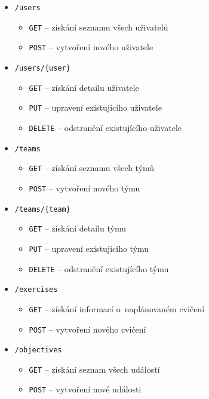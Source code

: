 \documentclass[
  digital,
  twoside,
  table, 
  nolof, 
  nolot
]{fithesis3}
\begin{document}
\renewcommand\labelitemii{$\square$}
\begin{itemize}
    \item \texttt{/users}
    \begin{itemize}
        \item \texttt{GET} -- získání seznamu všech uživatelů
        \item \texttt{POST} --  vytvoření nového uživatele
    \end{itemize}
    
    \item \texttt{/users/\{user\}}
    \begin{itemize}
        \item \texttt{GET} -- získání detailu uživatele
        \item \texttt{PUT} -- upravení existujícího uživatele
        \item \texttt{DELETE} -- odstranění existujícího uživatele
    \end{itemize}
    
    \item \texttt{/teams}
    \begin{itemize}
        \item \texttt{GET} -- získání seznamu všech týmů
        \item \texttt{POST} --  vytvoření nového týmu
    \end{itemize}
    
    \item \texttt{/teams/\{team\}}
    \begin{itemize}
        \item \texttt{GET} -- získání detailu týmu
        \item \texttt{PUT} -- upravení existujícího týmu
        \item \texttt{DELETE} -- odstranění existujícího týmu
    \end{itemize}
    
    \item \texttt{/exercises}
    \begin{itemize}
        \item \texttt{GET} -- získání informací o~naplánovaném cvičení
        \item \texttt{POST} -- vytvoření nového cvičení
    \end{itemize}
    
    \item \texttt{/objectives}
    \begin{itemize}
        \item \texttt{GET} -- získání seznam všech událostí
        \item \texttt{POST} --  vytvoření nové události
    \end{itemize}
        

\end{itemize}
\end{document}
